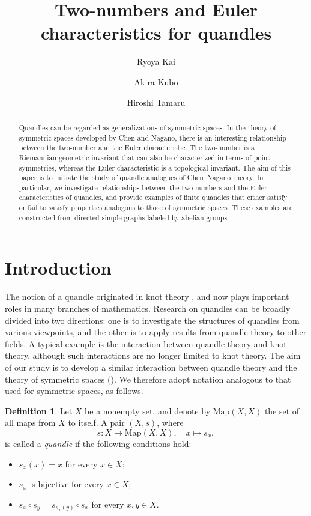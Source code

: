 \documentclass[12pt]{amsart}
\title{Two-numbers and Euler characteristics for quandles}
\author{Ryoya Kai}
\author{Akira Kubo}
\author{Hiroshi Tamaru}
\date{}
\theoremstyle{definition}
\newtheorem{Def}[Prop]{Definition}
\newcommand{\Map}{\mathrm{Map}}
\begin{document}
 

\maketitle 

\begin{abstract} 
Quandles can be regarded as generalizations of symmetric spaces. 
In the theory of symmetric spaces developed by Chen and Nagano, 
there is an interesting relationship between the two-number and the Euler characteristic. 
The two-number is a Riemannian geometric invariant that can also be characterized in terms of point symmetries, 
whereas the Euler characteristic is a topological invariant. 
The aim of this paper is to initiate the study of quandle analogues of Chen--Nagano theory. 
In particular, 
we investigate relationships between the two-numbers and the Euler characteristics of quandles, 
and provide examples of finite quandles that either satisfy or fail to satisfy properties analogous 
to those of symmetric spaces. 
These examples are constructed from directed simple graphs labeled by abelian groups. 
\end{abstract}

\section{Introduction}
\label{sec:1} 

The notion of a quandle originated in knot theory \cite{Joyce, Matveev}, 
and now plays important roles in many branches of mathematics. 
Research on quandles can be broadly divided into two directions: 
one is to investigate the structures of quandles from various viewpoints, 
and the other is to apply results from quandle theory to other fields. 
A typical example is the interaction between quandle theory and knot theory, 
although such interactions are no longer limited to knot theory. 
The aim of our study is to develop a similar interaction between quandle theory and the theory of symmetric spaces 
(\cite{Tamaru, IT}). 
We therefore adopt notation analogous to that used for symmetric spaces, as follows. 

\begin{Def}
Let $X$ be a nonempty set, and denote by $\Map(X,X)$ the set of all maps from $X$ to itself. 
A pair $(X,s)$, where
\[
s \colon X \rightarrow \Map(X,X), \quad x \mapsto s_x , 
\]
is called a \textit{quandle} if the following conditions hold:
\begin{itemize}
\item[(Q1)]
$s_x(x)=x$ for every $x\in X$;
\item[(Q2)]
$s_x$ is bijective for every $x\in X$;
\item[(Q3)]
$s_x\circ s_y=s_{s_x(y)}\circ s_x$ for every $x,y\in X$.
\end{itemize}
\end{Def}
\end{document}
